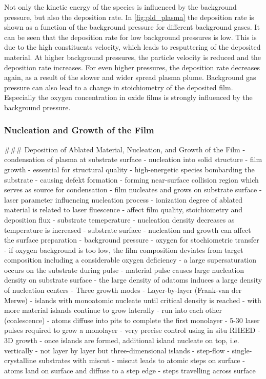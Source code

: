 Not only the kinetic energy of the species is influenced by the background pressure,
but also the deposition rate. 
In \cref{fig:pld_plasma} the deposition rate is shown as a function of the background
pressure for different background gases.
It can be seen that the deposition rate for low background pressures is low.
This is due to the high constituents velocity, which leads to resputtering of the
deposited material.
At higher background pressures, the particle velocity is reduced and the deposition
rate increases.
For even higher pressures, the deposition rate decreases again, 
as a result of the slower and wider spread plasma plume.
Background gas pressure can also lead to a change in stoichiometry of the deposited 
film.
Especially the oxygen concentration in oxide films is strongly influenced by the
background pressure.

\subsubsection{Nucleation and Growth of the Film}
### Deposition of Ablated Material, Nucleation, and Growth of the Film
- condensation of plasma at substrate surface
- nucleation into solid structure
- film growth
- essential for structural quality
- high-energetic species bombarding the substrate
- causing defekt formation
- forming near-surface collision region which serves as source for condensation
- film nucleates and grows on substrate surface
- laser parameter influencing nucleation process
	- ionization degree of ablated material is related to laser fluescence
	- affect film quality, stoichiometry and deposition flux
- substrate temeperature
	- nucleation density decreases as temperature is increased
- substrate surface
	- nucleation and growth can affect the surface preparation
- background pressure
	- oxygen for stochiometric transfer 
	- if oxygen background is too low, the film composition deviates from target composition including a considerable oxygen deficiency
- a large supersaturation occurs on the substrate during pulse
- material pulse causes large nucleation density on substrate surface
- the large density of adatoms induces a large density of nucleation centers
- Three growth modes
	- Layer-by-layer (Frank-van der Merwe)
		- islands with monoatomic nucleate until critical density is reached
		- with more material islands continue to grow laterally
		- run into each other (coalescence)
		- atoms diffuse into pits to complete the first monolayer
	- 5-30 laser pulses required to grow a monolayer
	- very precise control using in situ RHEED 
- 3D growth
	- once islands are formed, additional island nucleate on top, i.e. vertically
	- not layer by layer but three-dimensional islands
- step-flow 
	- single-crystalline substrates with miscut
	- miscut leads to atomic steps on surface
	- atoms land on surface and diffuse to a step edge
	- steps travelling across surface


